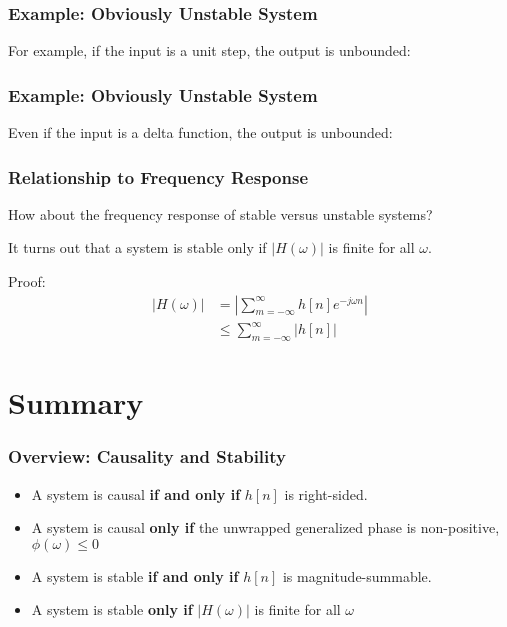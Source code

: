 \documentclass{beamer}
\begin{document}
\begin{frame}
  \frametitle{Example: Obviously Unstable System}

  For example, if the input is a unit step, the output is unbounded:
  \centerline{}
\end{frame}

\begin{frame}
  \frametitle{Example: Obviously Unstable System}

  Even if the input is a delta function, the output is unbounded:
  \centerline{}
\end{frame}

\begin{frame}
  \frametitle{Relationship to Frequency Response}

  How about the frequency response of stable versus unstable systems?

  It turns out that a system is stable only if $|H(\omega)|$ is finite for all $\omega$.

  Proof:
  \begin{align*}
    |H(\omega)| &= \left|\sum_{m=-\infty}^\infty h[n]e^{-j\omega n}\right|\\
    &\le \sum_{m=-\infty}^\infty \left|h[n]\right|
  \end{align*}
\end{frame}

\section[Summary]{Summary}
\setcounter{subsection}{1}

\begin{frame}
  \frametitle{Overview: Causality and Stability}

  \begin{itemize}
  \item A system is causal \textbf{if and only if} $h[n]$ is right-sided.
  \item A system is causal \textbf{only if} the unwrapped generalized phase is non-positive,
    $\phi(\omega)\le 0$
  \item A system is stable \textbf{if and only if} $h[n]$ is
    magnitude-summable.
  \item A system is stable \textbf{only if} $|H(\omega)|$ is finite for all $\omega$
  \end{itemize}
\end{frame}
\end{document}
